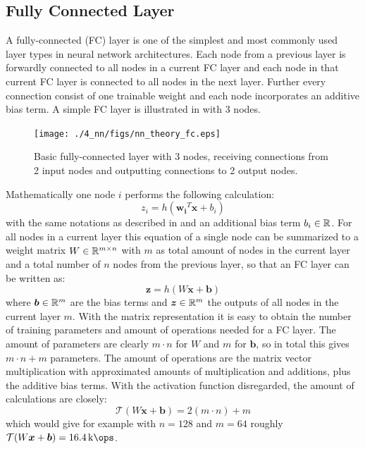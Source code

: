 
\subsection{Fully Connected Layer}
A fully-connected (FC) layer is one of the simplest and most commonly used layer types in neural network architectures.
Each node from a previous layer is forwardly connected to all nodes in a current FC layer and each node in that current FC layer is connected to all nodes in the next layer.
Further every connection consist of one trainable weight and each node incorporates an additive bias term.
A simple FC layer is illustrated in  with 3 nodes.
\begin{figure}[!ht]
  \centering
    \texttt{[image: ./4\_nn/figs/nn\_theory\_fc.eps]}
  \caption{Basic fully-connected layer with 3 nodes, receiving connections from 2 input nodes and outputting connections to 2 output nodes.}
  \label{fig:nn_theory_fc}
\end{figure}
\FloatBarrier
\noindent
Mathematically one node $i$ performs the following calculation:
\begin{equation}
  z_i = h(\bm{w_i}^T \bm{x} + b_i)
\end{equation}
with the same notations as described in  and an additional bias term $b_i \in \mathbb{R}$.
For all nodes in a current layer this equation of a single node can be summarized to a weight matrix $W \in \mathbb{R}^{m \times n}$ with $m$ as total amount of nodes in the current layer and a total number of $n$ nodes from the previous layer, so that an FC layer can be written as:
\begin{equation}
  \bm{z} = h(W \bm{x} + \bm{b})
\end{equation}
where $\bm{b} \in \mathbb{R}^m$ are the bias terms and $\bm{z} \in \mathbb{R}^m$ the outputs of all nodes in the current layer $m$.
With the matrix representation it is easy to obtain the number of training parameters and amount of operations needed for a FC layer.
The amount of parameters are clearly $m \cdot n$ for $W$ and $m$ for $\bm{b}$, so in total this gives $m \cdot n + m$ parameters.
The amount of operations are the matrix vector multiplication with approximated amounts of multiplication and additions, plus the additive bias terms.
With the activation function disregarded, the amount of calculations are closely:
\begin{equation} 
  \mathcal{T}(W \bm{x} + \bm{b}) = 2 (m \cdot n) + m
\end{equation}
which would give for example with $n = 128$ and $m = 64$ roughly $\mathcal{T}(W \bm{x} + \bm{b}) = \SI{16.4}{\kilo\ops}$.


